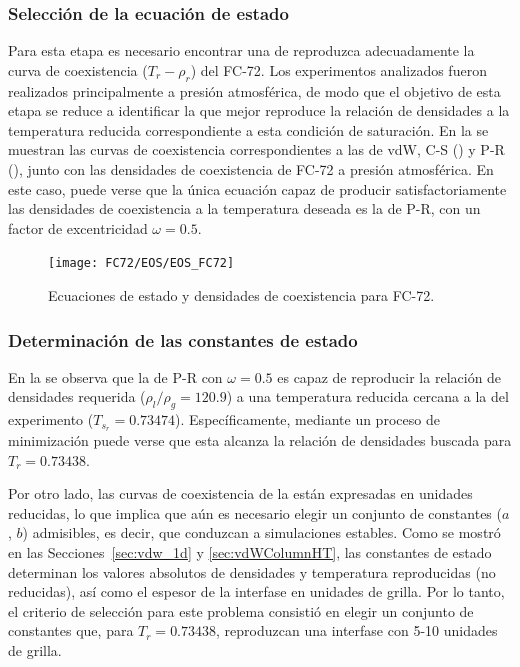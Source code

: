 \subsubsection{Selecci\'on de la ecuaci\'on de estado}

Para esta etapa es necesario encontrar una \eos{} de reproduzca adecuadamente la curva de coexistencia ($T_r - \rho_r$) del FC-72. Los experimentos analizados fueron realizados principalmente a presi\'on atmosf\'erica, de modo que el objetivo de esta etapa se reduce a identificar la \eos{} que mejor reproduce la relaci\'on de densidades a la temperatura reducida correspondiente a esta condici\'on de saturaci\'on. En la  se muestran las curvas de coexistencia correspondientes a las \eos{} de vdW, C-S () y P-R (), junto con las densidades de coexistencia de FC-72 a presi\'on atmosf\'erica. En este caso, puede  verse que la \'unica ecuaci\'on capaz de producir satisfactoriamente las densidades de coexistencia a la temperatura deseada es la de P-R, con un factor de excentricidad $\omega=0.5$.

\begin{figure}[ht]
	\centering
	\texttt{[image: FC72/EOS/EOS\_FC72]}
	\caption{Ecuaciones de estado y densidades de coexistencia para FC-72.}
	\label{fig:eos_fc72}
\end{figure}


\subsubsection{Determinaci\'on de las constantes de estado}

En la  se observa que la \eos{} de P-R con $\omega=0.5$ es capaz de reproducir la relaci\'on de densidades requerida ($\rho_l/\rho_g = 120.9$) a una temperatura reducida cercana a la del experimento ($T_{s_r}=0.73474$). Espec\'ificamente, mediante un proceso de minimizaci\'on puede verse que esta \eos{} alcanza la relaci\'on de densidades buscada para $T_r=0.73438$.

Por otro lado, las curvas de coexistencia de la  est\'an expresadas en unidades reducidas, lo que implica que a\'un es necesario elegir un conjunto de constantes ($a$, $b$) admisibles, es decir, que conduzcan a simulaciones estables. Como se mostr\'o en las Secciones~\ref{sec:vdw_1d} y \ref{sec:vdWColumnHT}, las constantes de estado determinan los valores absolutos de densidades y temperatura reproducidas (no reducidas), as\'i como el espesor de la interfase en unidades de grilla. Por lo tanto, el criterio de selecci\'on para este problema consisti\'o en elegir  un conjunto de constantes que, para $T_r=0.73438$, reproduzcan una interfase con 5-10 unidades de grilla.

